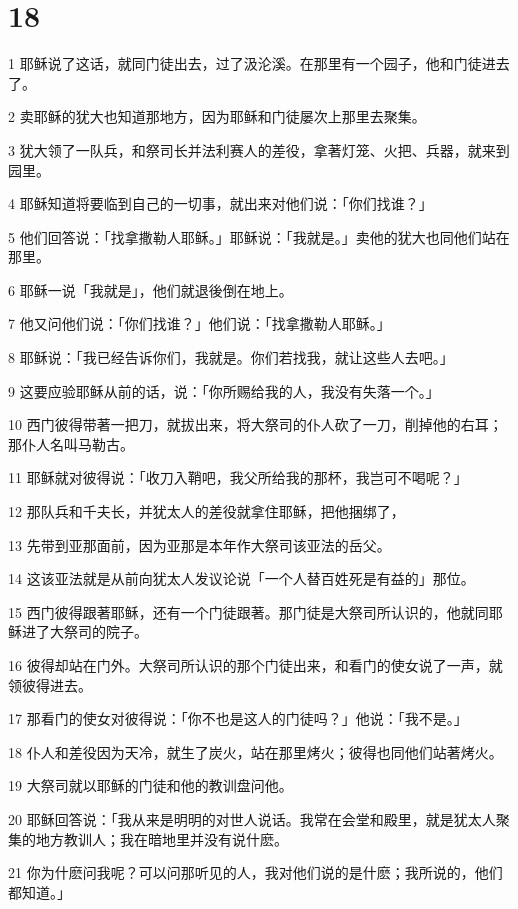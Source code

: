 \chapter{18}

\par 1 耶稣说了这话，就同门徒出去，过了汲沦溪。在那里有一个园子，他和门徒进去了。
\par 2 卖耶稣的犹大也知道那地方，因为耶稣和门徒屡次上那里去聚集。
\par 3 犹大领了一队兵，和祭司长并法利赛人的差役，拿著灯笼、火把、兵器，就来到园里。
\par 4 耶稣知道将要临到自己的一切事，就出来对他们说：「你们找谁？」
\par 5 他们回答说：「找拿撒勒人耶稣。」耶稣说：「我就是。」卖他的犹大也同他们站在那里。
\par 6 耶稣一说「我就是」，他们就退後倒在地上。
\par 7 他又问他们说：「你们找谁？」他们说：「找拿撒勒人耶稣。」
\par 8 耶稣说：「我已经告诉你们，我就是。你们若找我，就让这些人去吧。」
\par 9 这要应验耶稣从前的话，说：「你所赐给我的人，我没有失落一个。」
\par 10 西门彼得带著一把刀，就拔出来，将大祭司的仆人砍了一刀，削掉他的右耳；那仆人名叫马勒古。
\par 11 耶稣就对彼得说：「收刀入鞘吧，我父所给我的那杯，我岂可不喝呢？」
\par 12 那队兵和千夫长，并犹太人的差役就拿住耶稣，把他捆绑了，
\par 13 先带到亚那面前，因为亚那是本年作大祭司该亚法的岳父。
\par 14 这该亚法就是从前向犹太人发议论说「一个人替百姓死是有益的」那位。
\par 15 西门彼得跟著耶稣，还有一个门徒跟著。那门徒是大祭司所认识的，他就同耶稣进了大祭司的院子。
\par 16 彼得却站在门外。大祭司所认识的那个门徒出来，和看门的使女说了一声，就领彼得进去。
\par 17 那看门的使女对彼得说：「你不也是这人的门徒吗？」他说：「我不是。」
\par 18 仆人和差役因为天冷，就生了炭火，站在那里烤火；彼得也同他们站著烤火。
\par 19 大祭司就以耶稣的门徒和他的教训盘问他。
\par 20 耶稣回答说：「我从来是明明的对世人说话。我常在会堂和殿里，就是犹太人聚集的地方教训人；我在暗地里并没有说什麽。
\par 21 你为什麽问我呢？可以问那听见的人，我对他们说的是什麽；我所说的，他们都知道。」
